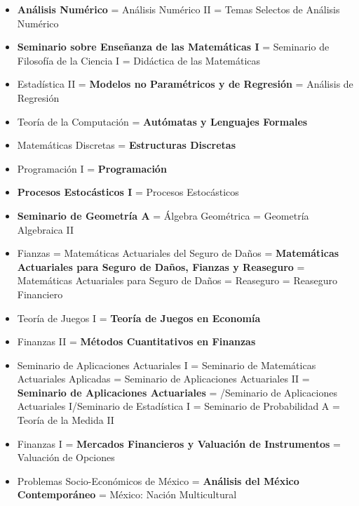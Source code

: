 \begin{itemize}
\item \textbf{Análisis Numérico} = Análisis Numérico II = Temas Selectos de Análisis Numérico

\item \textbf{Seminario sobre Enseñanza de las Matemáticas I} = Seminario de Filosofía de la Ciencia I = Didáctica de las Matemáticas

\item Estadística II = \textbf{Modelos no Paramétricos y de Regresión} = Análisis de Regresión

\item Teoría de la Computación = \textbf{Autómatas y Lenguajes Formales}

\item Matemáticas Discretas = \textbf{Estructuras Discretas}

\item Programación I = \textbf{Programación}

\item \textbf{Procesos Estocásticos I} = Procesos Estocásticos

\item \textbf{Seminario de Geometría A} = Álgebra Geométrica = Geometría Algebraica II

\item Fianzas = Matemáticas Actuariales del Seguro de Daños = \textbf{Matemáticas Actuariales para Seguro de Daños, Fianzas y Reaseguro} = Matemáticas Actuariales para Seguro de Daños = Reaseguro = Reaseguro Financiero

\item Teoría de Juegos I = \textbf{Teoría de Juegos en Economía}

\item Finanzas II = \textbf{Métodos Cuantitativos en Finanzas}

\item Seminario de Aplicaciones Actuariales I = Seminario de Matemáticas Actuariales Aplicadas = Seminario de Aplicaciones Actuariales II = \textbf{Seminario de Aplicaciones Actuariales}  = /Seminario de Aplicaciones Actuariales I/Seminario de Estadística I = Seminario de Probabilidad A = Teoría de la Medida II

\item Finanzas I = \textbf{Mercados Financieros y Valuación de Instrumentos} = Valuación de Opciones

\item Problemas Socio-Económicos de México = \textbf{Análisis del México Contemporáneo} = México: Nación Multicultural


\end{itemize}
